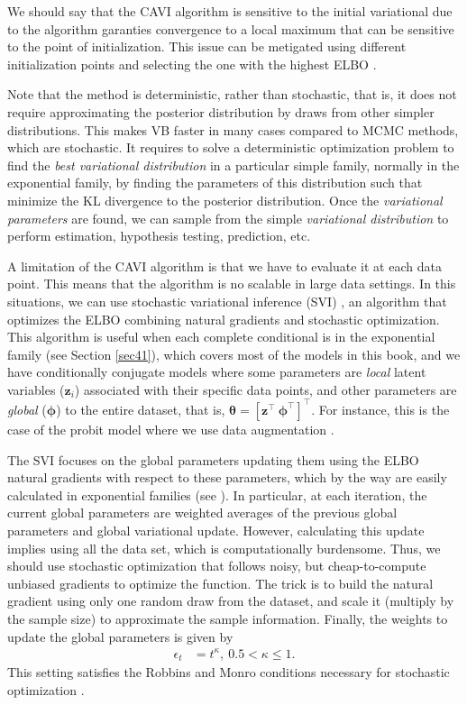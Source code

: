 We should say that the CAVI algorithm is sensitive to the initial variational due to the algorithm garanties convergence to a local maximum that can be sensitive to the point of initialization. This issue can be metigated using different initialization points and selecting the one with the highest ELBO \cite{blei2006variational}.

Note that the method is deterministic, rather than stochastic, that is, it does not require approximating the posterior distribution by draws from other simpler distributions. This makes VB faster in many cases compared to MCMC methods, which are stochastic. It requires to solve a deterministic optimization problem to find the \textit{best variational distribution} in a particular simple family, normally in the exponential family, by finding the parameters of this distribution such that minimize the KL divergence to the posterior distribution. Once the \textit{variational parameters} are found, we can sample from the simple \textit{variational distribution} to perform estimation, hypothesis testing, prediction, etc.
 
A limitation of the CAVI algorithm is that we have to evaluate it at each data point. This means that the algorithm is no scalable in large data settings. In this situations, we can use stochastic variational inference (SVI) \cite{hoffman2013stochastic}, an algorithm that optimizes the ELBO  combining natural gradients and stochastic optimization. This algorithm is useful when each complete conditional is in the exponential family (see Section \ref{sec41}), which covers most of the models in this book, and we have conditionally conjugate models where some parameters are \textit{local} latent variables ($\boldsymbol{z}_i$) associated with their specific data points, and other parameters are \textit{global} ($\boldsymbol{\phi}$) to the entire dataset, that is, $\boldsymbol\theta=[\boldsymbol{z}^{\top} \ \boldsymbol{\phi}^{\top}]^{\top}$. For instance, this is the case of the probit model where we use data augmentation \cite{Tanner1987}.

The SVI focuses on the global parameters updating them using the ELBO natural gradients with respect to these parameters, which by the way are easily calculated in exponential families (see \cite{blei2017variational}). In particular, at each iteration, the current global parameters are weighted averages of the previous global parameters and global variational update. However, calculating this update implies using all the data set, which is computationally burdensome. Thus, we should use stochastic optimization that follows noisy, but cheap-to-compute unbiased gradients to optimize the function. The trick is to build the natural gradient using only one random draw from the dataset, and scale it (multiply by the sample size) to approximate the sample information. Finally, the weights to update the global parameters is given by 
\begin{align*}
	\epsilon_t&=t^{\kappa}, \ 0.5 < \kappa \leq 1.
\end{align*} 
This setting satisfies the Robbins and Monro conditions necessary for stochastic optimization \cite{robbins1951stochastic}.

